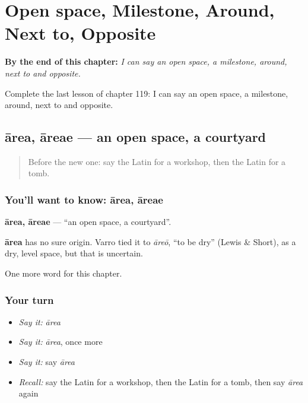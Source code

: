 
\chapter{Open space, Milestone, Around, Next to, Opposite}
\label{ch:la-open-space-milestone-around-next-to-opposite}

\begin{chapteropening}
\textbf{By the end of this chapter:} \emph{I can say an open space, a milestone, around, next to and opposite.}

Complete the last lesson of chapter 119: I can say an open space, a milestone, around, next to and opposite.
\end{chapteropening}

\section[ārea, āreae]{ārea, āreae — an open space, a courtyard}

\label{lesson:LA-C119-area}



\begin{quote}
Before the new one: say the Latin for a workshop, then the Latin for a tomb.
\end{quote}

\subsection*{You'll want to know: ārea, āreae}
\textbf{ārea, āreae} — \textquotedblleft{}an open space, a courtyard\textquotedblright{}.

\begin{cousinweb}
\textbf{ārea} has no sure origin. Varro tied it to \emph{āreō}, \textquotedblleft{}to be dry\textquotedblright{} (Lewis \& Short), as a dry, level space, but that is uncertain.
\end{cousinweb}

\begin{grammarlens}[title={What you've built}]
One more word for this chapter.
\end{grammarlens}

\subsection*{Your turn}
\begin{itemize}
\raggedright
  \item \emph{Say it:} \emph{ārea}
  \item \emph{Say it:} \emph{ārea}, once more
  \item \emph{Say it:} say \emph{ārea}
  \item \emph{Recall:} say the Latin for a workshop, then the Latin for a tomb, then say \emph{ārea} again
\end{itemize}

